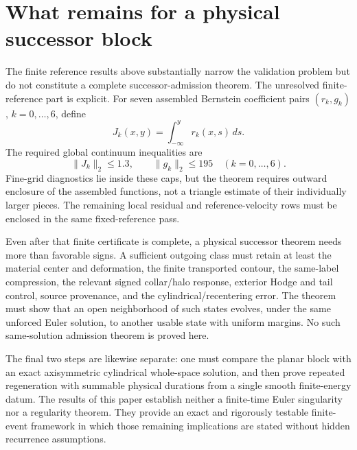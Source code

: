 \documentclass[11pt]{article}
\theoremstyle{definition}\newtheorem{definition}[theorem]{Definition}\newtheorem{problem}[theorem]{Problem}
\theoremstyle{remark}\newtheorem{remark}[theorem]{Remark}
\begin{document}
\section{What remains for a physical successor block}
The finite reference results above substantially narrow the validation problem but do not constitute a complete successor-admission theorem.  The unresolved finite-reference part is explicit.  For seven assembled Bernstein coefficient pairs $(r_k,g_k)$, $k=0,\ldots,6$, define
\[
J_k(x,y)=\int_{-\infty}^y r_k(x,s)\,ds.
\]
The required global continuum inequalities are
\[
\boxed{\|J_k\|_2\le1.3,\qquad\|g_k\|_2\le195
\quad(k=0,\ldots,6).}
\]
Fine-grid diagnostics lie inside these caps, but the theorem requires outward enclosure of the assembled functions, not a triangle estimate of their individually larger pieces.  The remaining local residual and reference-velocity rows must be enclosed in the same fixed-reference pass.

Even after that finite certificate is complete, a physical successor theorem needs more than favorable signs.  A sufficient outgoing class must retain at least the material center and deformation, the finite transported contour, the same-label compression, the relevant signed collar/halo response, exterior Hodge and tail control, source provenance, and the cylindrical/recentering error.  The theorem must show that an open neighborhood of such states evolves, under the same unforced Euler solution, to another usable state with uniform margins.  No such same-solution admission theorem is proved here.

The final two steps are likewise separate: one must compare the planar block with an exact axisymmetric cylindrical whole-space solution, and then prove repeated regeneration with summable physical durations from a single smooth finite-energy datum.  The results of this paper establish neither a finite-time Euler singularity nor a regularity theorem.  They provide an exact and rigorously testable finite-event framework in which those remaining implications are stated without hidden recurrence assumptions.
\end{document}
